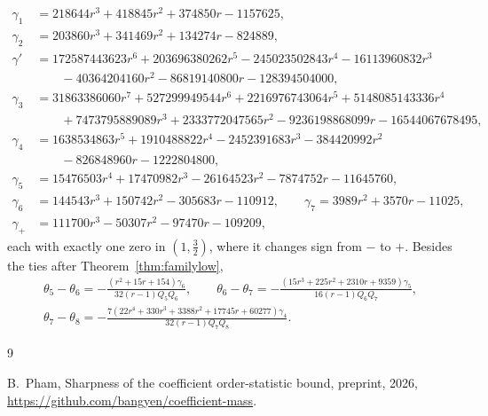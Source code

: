 \documentclass[11pt]{article}
\begin{document}
\begin{align*}
  \gamma_1&=218644r^3+418845r^2+374850r-1157625,\\
  \gamma_2&=203860r^3+341469r^2+134274r-824889,\\
  \gamma'&=172587443623r^6+203696380262r^5-245023502843r^4-16113960832r^3\\
  &\qquad-40364204160r^2-86819140800r-128394504000,\\
  \gamma_3&=31863386060r^7+527299949544r^6+2216976743064r^5+5148085143336r^4\\
  &\qquad+7473795889089r^3+2333772047565r^2-9236198868099r-16544067678495,\\
  \gamma_4&=1638534863r^5+1910488822r^4-2452391683r^3-384420992r^2\\
  &\qquad-826848960r-1222804800,\\
  \gamma_5&=15476503r^4+17470982r^3-26164523r^2-7874752r-11645760,\\
  \gamma_6&=144543r^3+150742r^2-305683r-110912,\qquad
  \gamma_7=3989r^2+3570r-11025,\\
  \gamma_+&=111700r^3-50307r^2-97470r-109209,
\end{align*}
each with exactly one zero in $(1,\tfrac32)$, where it changes sign from
$-$ to $+$.  Besides the ties after Theorem~\ref{thm:familylow},
\begin{gather*}
  \theta_5-\theta_6=-\frac{(r^2+15r+154)\gamma_6}{32(r-1)Q_5Q_6},\qquad
  \theta_6-\theta_7=-\frac{(15r^3+225r^2+2310r+9359)\gamma_5}{16(r-1)Q_6Q_7},\\
  \theta_7-\theta_8=-\frac{7(22r^4+330r^3+3388r^2+17745r+60277)\gamma_4}{32(r-1)Q_7Q_8} .
\end{gather*}

\begin{thebibliography}{9}

B.~Pham,
\newblock Sharpness of the coefficient order-statistic bound,
\newblock preprint, 2026, \url{https://github.com/bangyen/coefficient-mass}.

\end{thebibliography}
\end{document}
